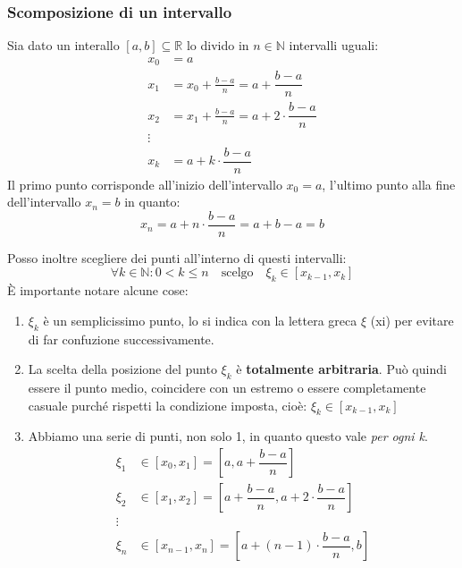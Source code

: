 \subsubsection{Scomposizione di un intervallo}
Sia dato un interallo $[a,b] \subseteq \mathbb{R}$ lo divido in $n 
\in \mathbb{N}$ intervalli uguali:
\begin{align*}
	x_0 &= a\\
	x_1 &= x_0 + \frac{b-a}{n} = a + \dfrac{b-a}{n}\\
	x_2 &= x_1 + \frac{b-a}{n} = a + 2 \cdot \dfrac{b-a}{n}\\
	\vdots\\
	x_k &= a + k \cdot \dfrac{b-a}{n}
\end{align*}
Il primo punto corrisponde all'inizio dell'intervallo $x_0 = a$, l'ultimo 
punto alla fine dell'intervallo $x_n = b$ in quanto:
\begin{equation*}
	x_n = a + n \cdot \dfrac{b-a}{n} = a + b - a = b
\end{equation*}

Posso inoltre scegliere dei punti all'interno di questi intervalli: 
\begin{equation*}
	\forall k \in \mathbb{N} : 0 < k \leq n \quad \text{scelgo} \quad \xi_k 
    \in [x_{k-1}, x_k]
\end{equation*}
È importante notare alcune cose:
\begin{enumerate}
	\item $\xi_k$ è un semplicissimo punto, lo si indica con la lettera greca 
        $\xi$ (xi) per evitare di far confuzione successivamente.

	\item La scelta della posizione del punto $\xi_k$ è \textbf{totalmente 
        arbitraria}. Può quindi essere il punto medio, coincidere con un 
        estremo o essere completamente casuale purché rispetti la condizione 
        imposta, cioè: $\xi_k \in [x_{k-1}, x_k]$

	\item Abbiamo una serie di punti, non solo 1, in quanto questo vale 
        \textit{per ogni k}.
	\begin{align*}
		\xi_1 &\in [x_0, x_1] = \left[a, a + \dfrac{b-a}{n} \right]\\
		\xi_2 &\in [x_1, x_2] = \left[a + \dfrac{b-a}{n}, a + 2 \cdot 
        \dfrac{b-a}{n} \right]\\
		\vdots\\
		\xi_n &\in [x_{n-1}, x_n] = \left[a + (n-1) \cdot \dfrac{b-a}{n},
        b \right]
	\end{align*}

\end{enumerate}

